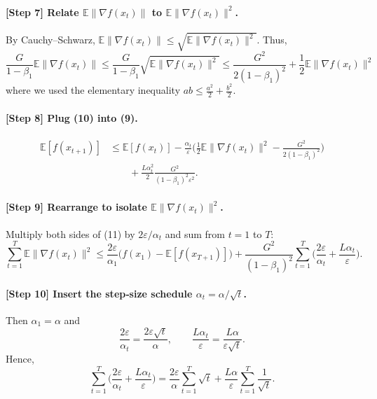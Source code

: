 \documentclass[11pt]{article}
\begin{document}
\paragraph{[Step 7] Relate $\mathbb{E}\|\nabla f(x_t)\|$ to $\mathbb{E}\|\nabla f(x_t)\|^{2}$.}
By Cauchy–Schwarz, $\mathbb{E}\|\nabla f(x_t)\|\le \sqrt{\mathbb{E}\|\nabla f(x_t)\|^{2}}$.
Thus,
\[
\frac{G}{1-\beta_1}\mathbb{E}\|\nabla f(x_t)\|
\le \frac{G}{1-\beta_1}\sqrt{\mathbb{E}\|\nabla f(x_t)\|^{2}}
\le \frac{G^{2}}{2(1-\beta_1)^{2}}+\frac{1}{2}\mathbb{E}\|\nabla f(x_t)\|^{2}
\tag{10}
\]
where we used the elementary inequality $ab\le \frac{a^{2}}{2}+ \frac{b^{2}}{2}$.

\paragraph{[Step 8] Plug (10) into (9).}
\[
\begin{aligned}
\mathbb{E}[f(x_{t+1})]
&\le \mathbb{E}[f(x_t)]
-\frac{\alpha_t}{\varepsilon}\Big(\frac{1}{2}\mathbb{E}\|\nabla f(x_t)\|^{2}
-\frac{G^{2}}{2(1-\beta_1)^{2}}\Big)\\
&\qquad+\frac{L\alpha_t^{2}}{2}\frac{G^{2}}{(1-\beta_1)^{2}\varepsilon^{2}} .
\end{aligned}
\tag{11}
\]

\paragraph{[Step 9] Rearrange to isolate $\mathbb{E}\|\nabla f(x_t)\|^{2}$.}
Multiply both sides of (11) by $2\varepsilon/\alpha_t$ and sum from $t=1$ to $T$:
\[
\sum_{t=1}^{T}\mathbb{E}\|\nabla f(x_t)\|^{2}
\le
\frac{2\varepsilon}{\alpha_1}\big(f(x_1)-\mathbb{E}[f(x_{T+1})]\big)
+\frac{G^{2}}{(1-\beta_1)^{2}}
\sum_{t=1}^{T}\Big( \frac{2\varepsilon}{\alpha_t} + \frac{L\alpha_t}{\varepsilon}\Big).
\tag{12}
\]

\paragraph{[Step 10] Insert the step‑size schedule $\alpha_t=\alpha/\sqrt{t}$.}
Then $\alpha_1=\alpha$ and
\[
\frac{2\varepsilon}{\alpha_t}= \frac{2\varepsilon\sqrt{t}}{\alpha},\qquad
\frac{L\alpha_t}{\varepsilon}= \frac{L\alpha}{\varepsilon\sqrt{t}} .
\]
Hence,
\[
\sum_{t=1}^{T}\Big( \frac{2\varepsilon}{\alpha_t} + \frac{L\alpha_t}{\varepsilon}\Big)
= \frac{2\varepsilon}{\alpha}\sum_{t=1}^{T}\sqrt{t}
+ \frac{L\alpha}{\varepsilon}\sum_{t=1}^{T}\frac{1}{\sqrt{t}} .
\tag{13}
\]
\end{document}
